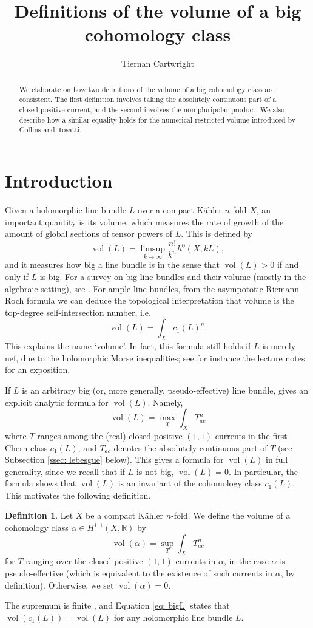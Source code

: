 \documentclass[a4paper]{amsart}
\title{Definitions of the volume of a big cohomology class}
\author{Tiernan Cartwright}
\newcommand{\R}{\mathbb{R}}
\newcommand{\vol}{\operatorname{vol}}
\theoremstyle{definition}
\newtheorem{definition}[theorem]{Definition}
\begin{document}
\begin{abstract}
    We elaborate on how two definitions of the volume of a big cohomology class are consistent. The first definition involves taking the absolutely continuous part of a closed positive current, and the second involves the non-pluripolar product. We also describe how a similar equality holds for the numerical restricted volume introduced by Collins and Tosatti.
\end{abstract}
\maketitle
\section{Introduction}
Given a holomorphic line bundle $L$ over a compact K\"ahler $n$-fold $X$, an important quantity is its volume, which measures the rate of growth of the amount of global sections of tensor powers of $L$. This is defined by
\[\vol(L) = \limsup_{k\to\infty} \frac{n!}{k^n}h^0(X, kL),\]
and it measures how big a line bundle is in the sense that $\vol(L) >0$ if and only if $L$ is big. For a survey on big line bundles and their volume (mostly in the algebraic setting), see \cite{ELMNP}. For ample line bundles, from the asympototic Riemann--Roch formula \cite[1.1.25]{Positivity} we can deduce the topological interpretation that volume is the top-degree self-intersection number, i.e.\
\[\vol(L) = \int_X c_1(L)^n.\]
This explains the name `volume'. In fact, this formula still holds if $L$ is merely nef, due to the holomorphic Morse inequalities; see for instance the lecture notes \cite{PluripotentialTheory} for an exposition.

If $L$ is an arbitrary big (or, more generally, pseudo-effective) line bundle, \cite[Theorem 1.2]{Boucksom} gives an explicit analytic formula for $\vol(L)$. Namely,  
\begin{equation}\label{eq: bigL}
    \vol(L) = \max_T\int_X T^n_{ac}
\end{equation}
where $T$ ranges among the (real) closed positive $(1, 1)$-currents in the first Chern class $c_1(L)$, and $T_{ac}$ denotes the absolutely continuous part of $T$ (see Subsection \ref{ssec: lebesgue} below).  This gives a formula for $\vol(L)$ in full generality, since we recall that if $L$ is not big, $\vol(L) = 0$. In particular, the formula shows that $\vol(L)$ is an invariant of the cohomology class $c_1(L)$. This motivates the following definition.
\begin{definition}{\cite[Definition 1.3]{Boucksom}}\label{def: Boucksom} Let $X$ be a compact K\"ahler $n$-fold. We define the volume of a cohomology class $\alpha\in H^{1, 1}(X, \R)$ by 
	\[\vol(\alpha) = \sup_T \int_X T^n_{ac}\]
	for $T$ ranging over the closed positive $(1, 1)$-currents in $\alpha$, in the case $\alpha$ is pseudo-effective (which is equivalent to the existence of such currents in $\alpha$, by definition). Otherwise, we set $\vol(\alpha) = 0$.
\end{definition}
The supremum is finite \cite[Proposition 2.6]{Boucksom}, and Equation \eqref{eq: bigL} states that $\vol(c_1(L)) = \vol(L)$ for any holomorphic line bundle $L$. 
\end{document}
